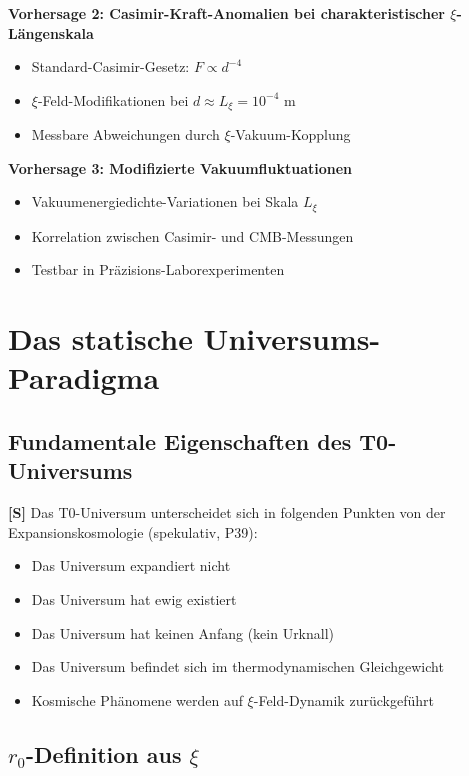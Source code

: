 	\textbf{Vorhersage 2: Casimir-Kraft-Anomalien bei charakteristischer $\xi$-Längenskala}
	\begin{itemize}
		\item Standard-Casimir-Gesetz: $F \propto d^{-4}$
		\item $\xi$-Feld-Modifikationen bei $d \approx L_\xi = 10^{-4}$ m
		\item Messbare Abweichungen durch $\xi$-Vakuum-Kopplung
	\end{itemize}
	
	\textbf{Vorhersage 3: Modifizierte Vakuumfluktuationen}
	\begin{itemize}
		\item Vakuumenergiedichte-Variationen bei Skala $L_\xi$
		\item Korrelation zwischen Casimir- und CMB-Messungen
		\item Testbar in Präzisions-Laborexperimenten
	\end{itemize}
	
	\section{Das statische Universums-Paradigma}
	
	\subsection{Fundamentale Eigenschaften des T0-Universums}
	
	\begin{important}
		\textbf{[S]} Das T0-Universum unterscheidet sich in folgenden Punkten von der Expansionskosmologie (spekulativ, P39):
		\begin{itemize}
			\item Das Universum expandiert nicht
			\item Das Universum hat ewig existiert
			\item Das Universum hat keinen Anfang (kein Urknall)
			\item Das Universum befindet sich im thermodynamischen Gleichgewicht
			\item Kosmische Phänomene werden auf $\xi$-Feld-Dynamik zurückgeführt
		\end{itemize}
	\end{important}
	
	\subsection{$r_0$-Definition aus $\xi$}
	
